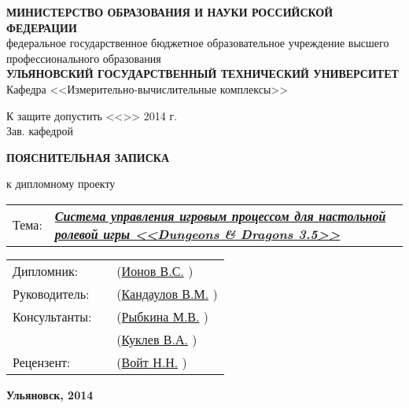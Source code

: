\begin{titlepage}



\small
\begin{center}

\MakeTextUppercase{\textbf{министерство образования и науки российской федерации}}\\
федеральное государственное бюджетное образовательное учреждение высшего профессионального образования\\
\MakeTextUppercase{\textbf{ульяновский государственный технический университет}}\\[0.7cm]

Кафедра <<Измерительно-вычислительные комплексы>>\\[0.7cm]

\begin{flushright}

К защите допустить <<\underline{\hspace{1cm}}>>\underline{\hspace{2.5cm}} 2014 г.\\
Зав. кафедрой \underline{\hspace{3.5cm}}

\end{flushright}

\vspace{1.5cm}

\LARGE

\textbf{ПОЯСНИТЕЛЬНАЯ ЗАПИСКА}

\Large

к дипломному проекту\\[0.7cm]

\normalsize

\begin{tabular}{p{1cm} p{13.5cm}}
Тема: & \textbf{\textit{\uline{Система управления игровым процессом для настольной ролевой игры <<Dungeons \& Dragons 3.5>>\hfill}}}
\end{tabular}

\vspace{2cm}

\begin{tabular}{p{3cm} p{6cm} p{5cm}}
    Дипломник:    & \uline{\hfill} & (\uline{Ионов В.С.\hfill}     )  \\[0.5cm]
    Руководитель: & \uline{\hfill} & (\uline{Кандаулов В.М.\hfill} )  \\[0.5cm]
    Консультанты: & \uline{\hfill} & (\uline{Рыбкина М.В.\hfill}   )  \\[0.5cm]
                  & \uline{\hfill} & (\uline{Куклев В.А.\hfill}    )  \\[0.5cm]
    Рецензент:    & \uline{\hfill} & (\uline{Войт Н.Н.\hfill}      )  \\
\end{tabular}

\vfill

\textbf{Ульяновск, 2014}

\end{center}

\end{titlepage}

\restoregeometry
